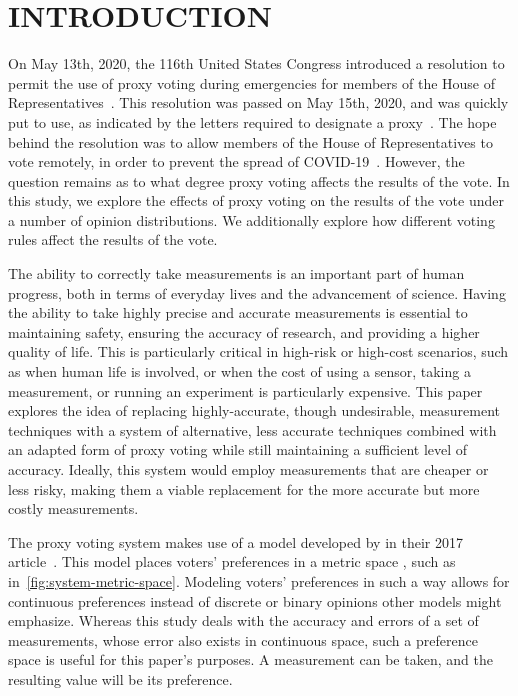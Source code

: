 %
%

\chapter{INTRODUCTION}\label{ch:introduction}
\thispagestyle{empty}

On May 13th, 2020, the 116th United States Congress introduced a resolution
to permit the use of proxy voting during emergencies for members of the House of
Representatives~\cite{Congress.gov2020}.
This resolution was passed on May 15th, 2020, and was quickly put to use, as
indicated by the letters required to designate a proxy~\cite{Clerk.House.gov2020}.
The hope behind the resolution was to allow members of the House of Representatives
to vote remotely, in order to prevent the spread of COVID-19~\cite{Congress.gov2020}.
However, the question remains as to what degree proxy voting affects the results of
the vote.
In this study, we explore the effects of proxy voting on the results of the vote
under a number of opinion distributions.
We additionally explore how different voting rules affect the results of the vote.






The ability to correctly take measurements is an important part of human
progress, both in terms of everyday lives and the advancement of science.
Having the ability to take highly precise and accurate measurements is essential
to maintaining safety, ensuring the accuracy of research, and providing a
higher quality of life.
This is particularly critical in high-risk or high-cost scenarios, such as when
human life is involved, or when the cost of using a sensor, taking a
measurement, or running an experiment is particularly expensive.
This paper explores the idea of replacing highly-accurate, though undesirable,
measurement techniques with a system of alternative, less accurate techniques combined
with an adapted form of proxy voting while still maintaining a sufficient level of
accuracy.
Ideally, this system would employ measurements that are cheaper or less risky, making
them a viable replacement for the more accurate but more costly measurements.

The proxy voting system makes use of a model developed by  in their 2017
article~\cite{Cohensius2017}.
This model places voters' preferences in a metric space \systemspace, such as
in~\autoref{fig:system-metric-space}.
Modeling voters' preferences in such a way allows for continuous preferences instead of
discrete or binary opinions other models might emphasize.
Whereas this study deals with the accuracy and errors of a set of measurements, whose
error also exists in continuous space, such a preference space is useful for this
paper's purposes.
A measurement can be taken, and the resulting value will be its preference.

